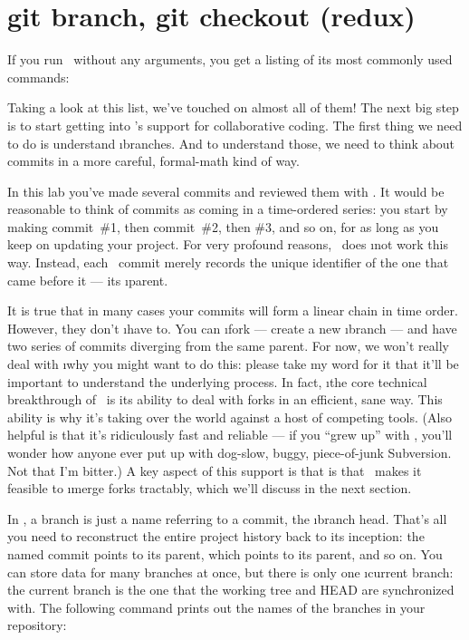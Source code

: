 \documentclass[letterpaper,12pt,titlepage,twoside]{article}
\begin{document}
\section{git branch, git checkout (redux)}

If you run \git\ without any arguments, you get a listing of its most commonly
used commands:


Taking a look at this list, we've touched on almost all of them! The next big
step is to start getting into \git's support for collaborative coding. The
first thing we need to do is understand \i{branches}. And to understand those,
we need to think about commits in a more careful, formal-math kind of way.

In this lab you've made several commits and reviewed them with . It
would be reasonable to think of commits as coming in a time-ordered series:
you start by making commit~\#1, then commit~\#2, then \#3, and so on, for as
long as you keep on updating your project. For very profound reasons,
\git\ does \i{not} work this way. Instead, each \git\ commit merely records
the unique identifier of the one that came before it --- its \i{parent}.


It is true that in many cases your commits will form a linear chain in time
order. However, they don't \i{have} to. You can \i{fork} --- create a new
\i{branch} --- and have two series of commits diverging from the same parent.
For now, we won't really deal with \i{why} you might want to do this: please
take my word for it that it'll be important to understand the underlying
process. In fact, \i{the core technical breakthrough of \git\ is its ability
  to deal with forks in an efficient, sane way.} This ability is why it's
taking over the world against a host of competing tools. (Also helpful is that
it's ridiculously fast and reliable --- if you ``grew up'' with \git, you'll
wonder how anyone ever put up with dog-slow, buggy, piece-of-junk Subversion.
Not that I'm bitter.) A key aspect of this support is that is that \git\ makes
it feasible to \i{merge} forks tractably, which we'll discuss in the next
section.

In \git, a branch is just a name referring to a commit, the \i{branch head}.
That's all you need to reconstruct the entire project history back to its
inception: the named commit points to its parent, which points to its parent,
and so on. You can store data for many branches at once, but there is only one
\i{current branch}: the current branch is the one that the working tree and
HEAD are synchronized with. The following command prints out the names of the
branches in your repository:
\end{document}
